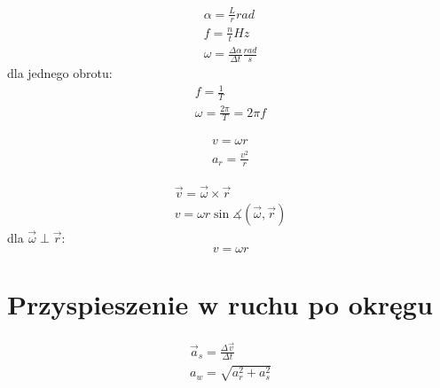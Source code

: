 \begin{gather*}
  \alpha = \frac Lr \unit{rad}\\
  f = \frac nt \unit{Hz}\\
  \omega = \frac{\Delta \alpha}{\Delta t} \unit{\frac{rad}{s}}
\end{gather*}
dla jednego obrotu:
\begin{gather*}
  f = \frac 1 T\\
  \omega = \frac{2\pi}{T} = 2\pi f
\end{gather*}

\begin{gather*}
  v = \omega r\\
  a_r = \frac{v^2}{r}
\end{gather*}

\begin{gather*}
  \vec v = \vec \omega \times \vec r\\
  v = \omega r \sin\measuredangle(\vec \omega, \vec r)
\end{gather*}
dla $\vec \omega \perp \vec r$:
\begin{equation*}
  v = \omega r
\end{equation*}

\section{Przyspieszenie w ruchu po okręgu}
\begin{gather*}
  \vec a_s = \frac{\Delta \vec v}{\Delta t}\\[0.5em]
  a_w = \sqrt{a_r^2 + a_s^2}
\end{gather*}
